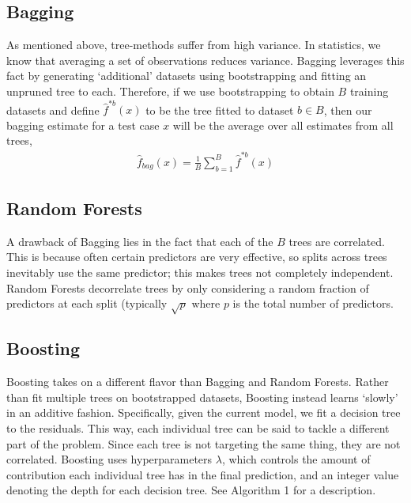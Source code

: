 \documentclass[10pt,a4paper]{article}
\begin{document}
\subsection{Bagging}
As mentioned above, tree-methods suffer from high variance. In statistics, we know that averaging a set of observations reduces variance. Bagging leverages this fact by generating `additional' datasets using bootstrapping and fitting an unpruned tree to each. Therefore, if we use bootstrapping to obtain $B$ training datasets and define $\hat{f}^{*b}(x)$ to be the tree fitted to dataset $b \in B$, then our bagging estimate for a test case $x$ will be the average over all estimates from all trees,
\begin{align*}                                                 
	\hat{f}_{bag}(x) = \frac{1}{B} \sum_{b=1}^B \hat{f}^{*b}(x)
\end{align*}

\subsection{Random Forests}
A drawback of Bagging lies in the fact that each of the $B$ trees are correlated. This is because often certain predictors are very effective, so splits across trees inevitably use the same predictor; this makes trees not completely independent. Random Forests decorrelate trees by only considering a random fraction of predictors at each split (typically $\sqrt{p}$ where $p$ is the total number of predictors.

\subsection{Boosting}

Boosting takes on a different flavor than Bagging and Random Forests. Rather than fit multiple trees on bootstrapped datasets, Boosting instead learns `slowly' in an additive fashion. Specifically, given the current model, we fit a decision tree to the residuals. This way, each individual tree can be said to tackle a different part of the problem. Since each tree is not targeting the same thing, they are not correlated. Boosting uses hyperparameters $\lambda$, which controls the amount of contribution each individual tree has in the final prediction, and an integer value denoting the depth for each decision tree. See Algorithm 1 for a description.
\end{document}
